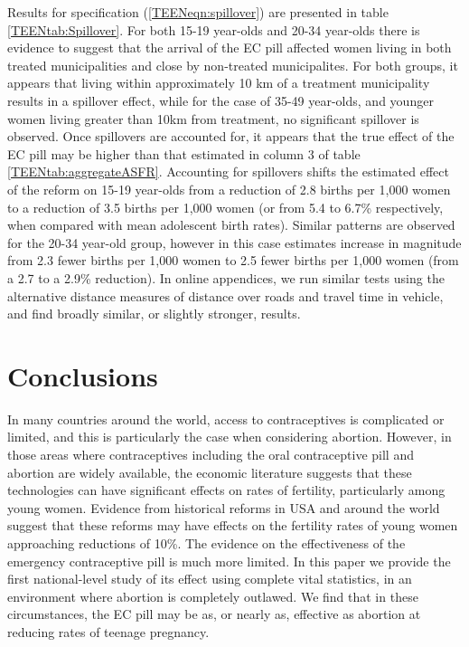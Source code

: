 Results for specification (\ref{TEENeqn:spillover}) are presented in table
\ref{TEENtab:Spillover}. For both 15-19 year-olds and 20-34 year-olds there is
evidence to suggest that the arrival of the EC pill affected women living in
both treated municipalities and close by non-treated municipalites. For both groups,
it appears that living within approximately 10 km of a treatment municipality 
results in a spillover effect, while for the case of 35-49 year-olds, and younger
women living greater than 10km from treatment, no significant spillover is
observed.  Once spillovers are accounted for, it appears that the true effect of
the EC pill may be higher than that estimated in column 3 of table
\ref{TEENtab:aggregateASFR}. Accounting for spillovers shifts the estimated
effect of the reform on 15-19 year-olds from a reduction of 2.8 births per 1,000
women to a reduction of 3.5 births per 1,000 women (or from 5.4 to 6.7\%
respectively, when compared with mean adolescent birth rates).  Similar patterns
are observed for the 20-34 year-old group, however in this case estimates
increase in magnitude from 2.3 fewer births per 1,000 women to 2.5 fewer births
per 1,000 women (from a 2.7 to a 2.9\% reduction). In online appendices, we run
similar tests using the alternative distance measures of distance over roads and
travel time in vehicle, and find broadly similar, or slightly stronger, results.

\section{Conclusions}
\label{TEENscn:conclusion}
In many countries around the world, access to contraceptives is complicated or
limited, and this is particularly the case when considering abortion.  However,
in those areas where contraceptives including the oral contraceptive pill and 
abortion are widely available, the economic literature suggests that these
technologies can have significant effects on rates of fertility, particularly
among young women.  Evidence from historical reforms in USA and around the world
suggest that these reforms may have effects on the fertility rates of young women 
approaching reductions of 10\%.  The evidence on the effectiveness of the
emergency contraceptive pill is much more limited.  In this paper we provide the
first national-level study of its effect using complete vital statistics, in an
environment where abortion is completely outlawed. We find that in these
circumstances, the EC pill may be as, or nearly as, effective as abortion at
reducing rates of teenage pregnancy.

